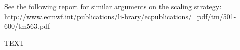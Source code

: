 \documentclass[hess]{copernicus}
\begin{document}
See the following report for similar arguments on the scaling strategy: http://www.ecmwf.int/publications/li-brary/ecpublications/\_pdf/tm/501-600/tm563.pdf


\conclusions




%




\begin{acknowledgements}
TEXT
\end{acknowledgements}





%
%
%
%
%
%
%








%
%
%
%
%
%
%
%
\end{document}
